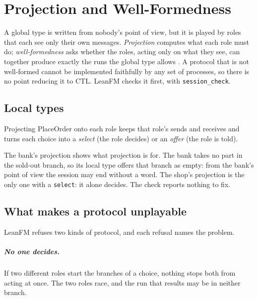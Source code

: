 \chapter{Projection and Well-Formedness}\label{ch:projection}

A global type is written from nobody's point of view, but it is played by roles that
each see only their own messages. \emph{Projection} computes what each role must do;
\emph{well-formedness} asks whether the roles, acting only on what they see, can
together produce exactly the runs the global type allows
\citep{honda2008multiparty,denielou2012communicating}. A protocol that is not
well-formed cannot be implemented faithfully by any set of processes, so there is no
point reducing it to CTL. LeanFM checks it first, with \texttt{session\_check}.

\section{Local types}

Projecting PlaceOrder onto each role keeps that role's sends and receives and turns
each choice into a \emph{select} (the role decides) or an \emph{offer} (the role is
told).


The bank's projection shows what projection is for. The bank takes no part in the
sold-out branch, so its local type offers that branch as empty: from the bank's point
of view the session may end without a word. The shop's projection is the only one with
a \texttt{select}: it alone decides. The check reports nothing to fix.


\section{What makes a protocol unplayable}

LeanFM refuses two kinds of protocol, and each refusal names the problem.

\paragraph{No one decides.} If two different roles start the branches of a choice,
nothing stops both from acting at once. The two roles race, and the run that results
may be in neither branch.



